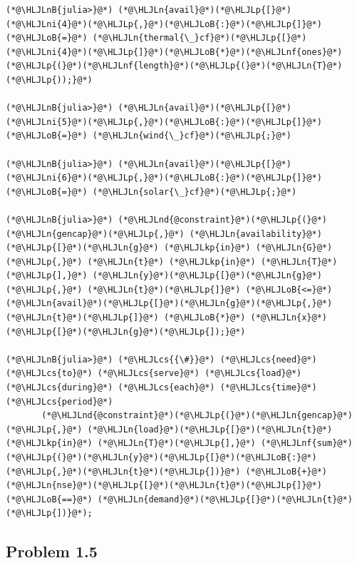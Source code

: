 \documentclass[12pt,a4paper]{article}
\newcommand{\HLJLkp}[1]{\textcolor[RGB]{148,91,176}{\textbf{#1}}}
\newcommand{\HLJLn}[1]{#1}
\newcommand{\HLJLnd}[1]{\textcolor[RGB]{214,102,97}{#1}}
\newcommand{\HLJLnf}[1]{\textcolor[RGB]{66,102,213}{#1}}
\newcommand{\HLJLnB}[1]{\textcolor[RGB]{59,151,46}{#1}}
\newcommand{\HLJLni}[1]{\textcolor[RGB]{59,151,46}{#1}}
\newcommand{\HLJLoB}[1]{\textcolor[RGB]{102,102,102}{\textbf{#1}}}
\newcommand{\HLJLp}[1]{#1}
\newcommand{\HLJLcs}[1]{\textcolor[RGB]{153,153,119}{\textit{#1}}}
\begin{document}
\begin{lstlisting}
(*@\HLJLnB{julia>}@*) (*@\HLJLn{avail}@*)(*@\HLJLp{[}@*)(*@\HLJLni{4}@*)(*@\HLJLp{,}@*)(*@\HLJLoB{:}@*)(*@\HLJLp{]}@*) (*@\HLJLoB{=}@*) (*@\HLJLn{thermal{\_}cf}@*)(*@\HLJLp{[}@*)(*@\HLJLni{4}@*)(*@\HLJLp{]}@*)(*@\HLJLoB{*}@*)(*@\HLJLnf{ones}@*)(*@\HLJLp{(}@*)(*@\HLJLnf{length}@*)(*@\HLJLp{(}@*)(*@\HLJLn{T}@*)(*@\HLJLp{));}@*)

(*@\HLJLnB{julia>}@*) (*@\HLJLn{avail}@*)(*@\HLJLp{[}@*)(*@\HLJLni{5}@*)(*@\HLJLp{,}@*)(*@\HLJLoB{:}@*)(*@\HLJLp{]}@*) (*@\HLJLoB{=}@*) (*@\HLJLn{wind{\_}cf}@*)(*@\HLJLp{;}@*)

(*@\HLJLnB{julia>}@*) (*@\HLJLn{avail}@*)(*@\HLJLp{[}@*)(*@\HLJLni{6}@*)(*@\HLJLp{,}@*)(*@\HLJLoB{:}@*)(*@\HLJLp{]}@*) (*@\HLJLoB{=}@*) (*@\HLJLn{solar{\_}cf}@*)(*@\HLJLp{;}@*)

(*@\HLJLnB{julia>}@*) (*@\HLJLnd{@constraint}@*)(*@\HLJLp{(}@*)(*@\HLJLn{gencap}@*)(*@\HLJLp{,}@*) (*@\HLJLn{availability}@*)(*@\HLJLp{[}@*)(*@\HLJLn{g}@*) (*@\HLJLkp{in}@*) (*@\HLJLn{G}@*)(*@\HLJLp{,}@*) (*@\HLJLn{t}@*) (*@\HLJLkp{in}@*) (*@\HLJLn{T}@*)(*@\HLJLp{],}@*) (*@\HLJLn{y}@*)(*@\HLJLp{[}@*)(*@\HLJLn{g}@*)(*@\HLJLp{,}@*) (*@\HLJLn{t}@*)(*@\HLJLp{]}@*) (*@\HLJLoB{<=}@*) (*@\HLJLn{avail}@*)(*@\HLJLp{[}@*)(*@\HLJLn{g}@*)(*@\HLJLp{,}@*) (*@\HLJLn{t}@*)(*@\HLJLp{]}@*) (*@\HLJLoB{*}@*) (*@\HLJLn{x}@*)(*@\HLJLp{[}@*)(*@\HLJLn{g}@*)(*@\HLJLp{]);}@*)

(*@\HLJLnB{julia>}@*) (*@\HLJLcs{{\#}}@*) (*@\HLJLcs{need}@*) (*@\HLJLcs{to}@*) (*@\HLJLcs{serve}@*) (*@\HLJLcs{load}@*) (*@\HLJLcs{during}@*) (*@\HLJLcs{each}@*) (*@\HLJLcs{time}@*) (*@\HLJLcs{period}@*)
       (*@\HLJLnd{@constraint}@*)(*@\HLJLp{(}@*)(*@\HLJLn{gencap}@*)(*@\HLJLp{,}@*) (*@\HLJLn{load}@*)(*@\HLJLp{[}@*)(*@\HLJLn{t}@*) (*@\HLJLkp{in}@*) (*@\HLJLn{T}@*)(*@\HLJLp{],}@*) (*@\HLJLnf{sum}@*)(*@\HLJLp{(}@*)(*@\HLJLn{y}@*)(*@\HLJLp{[}@*)(*@\HLJLoB{:}@*)(*@\HLJLp{,}@*)(*@\HLJLn{t}@*)(*@\HLJLp{])}@*) (*@\HLJLoB{+}@*) (*@\HLJLn{nse}@*)(*@\HLJLp{[}@*)(*@\HLJLn{t}@*)(*@\HLJLp{]}@*) (*@\HLJLoB{==}@*) (*@\HLJLn{demand}@*)(*@\HLJLp{[}@*)(*@\HLJLn{t}@*)(*@\HLJLp{])}@*);
\end{lstlisting}

\subsection{Problem 1.5}
\end{document}
